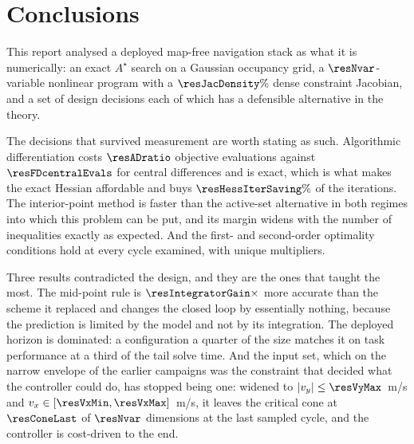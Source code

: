 \documentclass[11pt,a4paper]{article}
\newcommand{\astar}{$A^\star$}
\begin{document}
\section{Conclusions}
\label{sec:conclusions}

This report analysed a deployed map-free navigation stack as what it is numerically: an exact \astar{} search
on a Gaussian occupancy grid, a $\resNvar$-variable nonlinear program with a $\resJacDensity\%$ dense
constraint Jacobian, and a set of design decisions each of which has a defensible alternative in the theory.

The decisions that survived measurement are worth stating as such. Algorithmic differentiation costs
$\resADratio$ objective evaluations against $\resFDcentralEvals$ for central differences and is exact, which
is what makes the exact Hessian affordable and buys $\resHessIterSaving\%$ of the iterations. The
interior-point method is faster than the active-set alternative in both regimes into which this problem can
be put, and its margin widens with the number of inequalities exactly as expected. And the
first- and second-order optimality conditions hold at every cycle examined, with unique multipliers.

Three results contradicted the design, and they are the ones that taught the most. The mid-point rule is
$\resIntegratorGain\times$ more accurate than the scheme it replaced and changes the closed loop by
essentially nothing, because the prediction is limited by the model and not by its integration. The deployed
horizon is dominated: a configuration a quarter of the size matches it on task performance at a third of the
tail solve time. And the input set, which on
the narrow envelope of the earlier campaigns was the constraint that decided what the controller could do,
has stopped being one: widened to $|v_y|\le\resVyMax$~m/s and $v_x\in[\resVxMin,\resVxMax]$~m/s, it leaves
the critical cone at $\resConeLast$ of $\resNvar$ dimensions at the last sampled cycle, and the controller
is cost-driven to the end.
\end{document}
